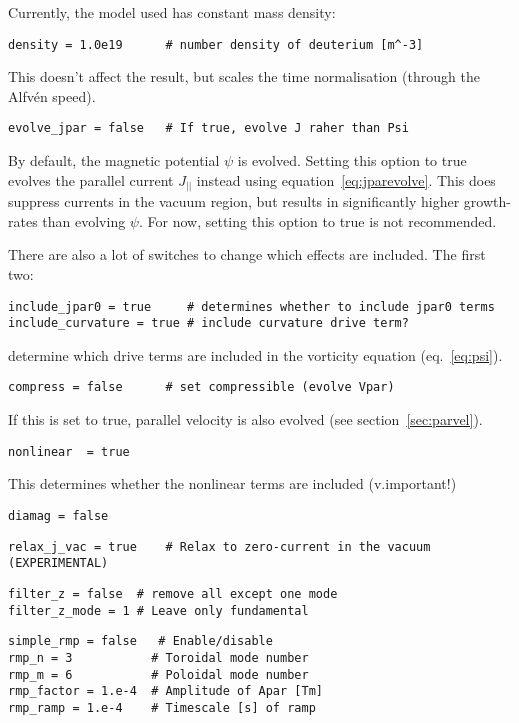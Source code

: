 \documentclass[12pt, a4paper]{article}
\begin{document}
Currently, the model used has constant mass density:
\begin{verbatim}
density = 1.0e19      # number density of deuterium [m^-3]
\end{verbatim}
This doesn't affect the result, but scales the time normalisation (through the Alfv\'en speed). 

\begin{verbatim}
evolve_jpar = false   # If true, evolve J raher than Psi
\end{verbatim}
By default, the magnetic potential $\psi$ is evolved. Setting this option to true evolves
the parallel current $J_{||}$ instead using equation~\ref{eq:jparevolve}.
This does suppress currents in the vacuum region,
but results in significantly higher growth-rates than evolving $\psi$. For now,
setting this option to true is not recommended.

There are also a lot of switches to change which effects are included. The first two:
\begin{verbatim}
include_jpar0 = true     # determines whether to include jpar0 terms
include_curvature = true # include curvature drive term?
\end{verbatim}
determine which drive terms are included in the vorticity equation (eq.~\ref{eq:psi}).

\begin{verbatim}
compress = false      # set compressible (evolve Vpar)
\end{verbatim}
If this is set to true, parallel velocity is also evolved (see section~\ref{sec:parvel}).

\begin{verbatim}
nonlinear  = true
\end{verbatim}
This determines whether the nonlinear terms are included (v.important!)

\begin{verbatim}
diamag = false
\end{verbatim}

\begin{verbatim}
relax_j_vac = true    # Relax to zero-current in the vacuum (EXPERIMENTAL)
\end{verbatim}

\begin{verbatim}
filter_z = false  # remove all except one mode
filter_z_mode = 1 # Leave only fundamental
\end{verbatim}

\begin{verbatim}
simple_rmp = false   # Enable/disable
rmp_n = 3           # Toroidal mode number
rmp_m = 6           # Poloidal mode number
rmp_factor = 1.e-4  # Amplitude of Apar [Tm]
rmp_ramp = 1.e-4    # Timescale [s] of ramp
\end{verbatim}
\end{document}
